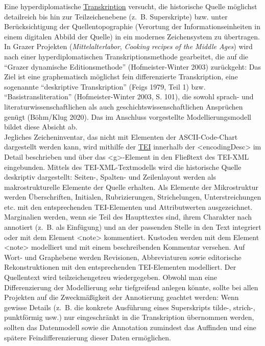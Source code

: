 \documentclass{article}
\begin{document}
    Eine hyperdiplomatische \href{http://gams.uni-graz.at/o:konde.197}{Transkription} versucht, die historische Quelle möglichst detailreich bis
                  hin zur Teilzeichenebene (z. B. Superskripte) bzw. unter Berücksichtigung der
                  Quellentopographie (Verortung der Informationseinheiten in einem digitalen Abbild
                  der Quelle) in ein modernes Zeichensystem zu übertragen. In Grazer Projekten (\emph{Mittelalterlabor}, \emph{Cooking recipes of the
                     Middle Ages}) wird nach einer hyperdiplomatischen Transkriptionsmethode
                  gearbeitet, die auf die “Grazer dynamische Editionsmethode”
                     (Hofmeister-Winter 2003) zurückgeht: Das Ziel ist eine
                  graphematisch möglichst fein differenzierte Transkription, eine sogenannte
                  “deskriptive Transkription” (Feigs 1979, Teil 1) bzw.
                  “Basistransliteration” (Hofmeister-Winter 2003, S. 101), die sowohl
                  sprach- und literaturwissenschaftlichen als auch geschichtswissenschaftlichen
                  Ansprüchen genügt (Böhm/Klug 2020). Das im Anschluss vorgestellte
                  Modellierungsmodell bildet diese Absicht ab.\\
            
        Jegliches Zeicheninventar, das nicht mit Elementen der ASCII-Code-Chart
                  dargestellt werden kann, wird mithilfe der \href{http://gams.uni-graz.at/o:konde.178}{TEI} innerhalb der <encodingDesc> im Detail beschrieben und über das <g>-Element in den Fließtext des TEI-XML
                  eingebunden. Mittels des TEI-XML-Textmodells wird die historische Quelle
                  deskriptiv dargestellt: Seiten-, Spalten- und Zeilenlayout werden als
                  makrostrukturelle Elemente der Quelle erhalten. Als Elemente der Mikrostruktur
                  werden Überschriften, Initialen, Rubrizierungen, Strichelungen, Unterstreichungen
                  etc. mit den entsprechenden TEI-Elementen und Attributwerten ausgezeichnet.
                  Marginalien werden, wenn sie Teil des Haupttextes sind, ihrem Charakter nach
                  annotiert (z. B. als Einfügung) und an der passenden Stelle in den Text integriert
                  oder mit dem Element <note> kommentiert.
                  Kustoden werden mit dem Element <note>
                  modelliert und mit einem beschreibenden Kommentar versehen. Auf Wort- und
                  Graphebene werden Revisionen, Abbreviaturen sowie editorische Rekonstruktionen mit
                  den entsprechenden TEI-Elementen modelliert. Der Quellentext wird
                  teilzeichengetreu wiedergegeben. Obwohl man eine Differenzierung der Modellierung
                  sehr tiefgreifend anlegen könnte, sollte bei allen Projekten auf die
                  Zweckmäßigkeit der Annotierung geachtet werden: Wenn gewisse Details (z. B. die
                  konkrete Ausführung eines Superskripts tilde-, strich-, punktförmig usw.) nur
                  eingeschränkt in die Transkription übernommen werden, sollten das Datenmodell
                  sowie die Annotation zumindest das Auffinden und eine spätere Feindifferenzierung
                  dieser Daten ermöglichen.\\
            
\end{document}
